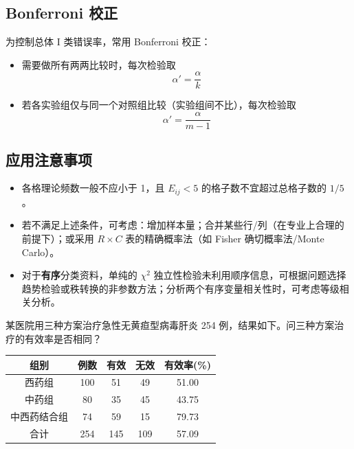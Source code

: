 \documentclass[lang=cn,10pt]{elegantbook}
\begin{document}
\subsection{Bonferroni 校正}
为控制总体 I 类错误率，常用 Bonferroni 校正：

\begin{itemize}
  \item 需要做所有两两比较时，每次检验取 
\begin{equation}  
  \alpha'=\dfrac{\alpha}{k}
\end{equation}

  \item 若各实验组仅与同一个对照组比较（实验组间不比），每次检验取
\begin{equation}
  \alpha'=\dfrac{\alpha}{m-1}
\end{equation}
\end{itemize}

\subsection{应用注意事项}
\begin{itemize}
  \item 各格理论频数一般不应小于 1，且 $E_{ij}<5$ 的格子数不宜超过总格子数的 $1/5$。
  \item 若不满足上述条件，可考虑：增加样本量；合并某些行/列（在专业上合理的前提下）；或采用 $R\times C$ 表的精确概率法（如 Fisher 确切概率法/Monte Carlo）。
  \item 对于\textbf{有序}分类资料，单纯的 $\chi^2$ 独立性检验未利用顺序信息，可根据问题选择趋势检验或秩转换的非参数方法；分析两个有序变量相关性时，可考虑等级相关分析。
\end{itemize}


\begin{exercise}
某医院用三种方案治疗急性无黄疸型病毒肝炎 254 例，结果如下。问三种方案治疗的有效率是否相同？

\begin{center}
\begin{tabular}{ccccc}
  \hline
  组别 & 例数 & 有效 & 无效 & 有效率(\%)\\
  \hline
  西药组 & 100 & 51 & 49 & 51.00\\
  中药组 & 80  & 35 & 45 & 43.75\\
  中西药结合组 & 74  & 59 & 15 & 79.73\\
  \hline
  合计 & 254 & 145 & 109 & 57.09\\
  \hline
\end{tabular}
\end{center}

\end{exercise}
\end{document}
